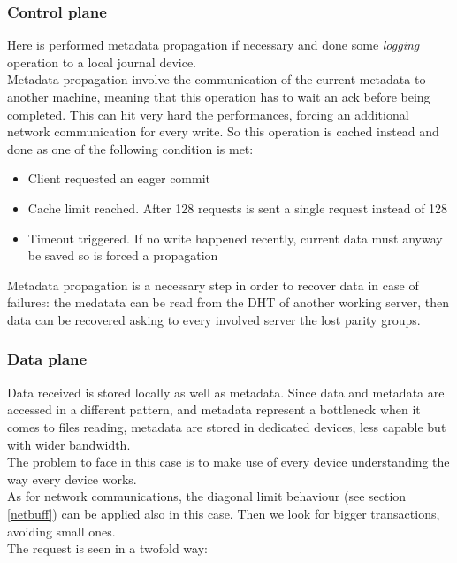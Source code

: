 \subsubsection*{Control plane}
Here is performed metadata propagation if necessary and done some
\textit{logging} operation to a local journal device. \\ Metadata propagation
involve the communication of the current metadata to another machine, meaning
that this operation has to wait an ack before being completed.  This can hit
very hard the performances, forcing an additional network communication for
every write. So this operation is cached instead and done as one of the
following condition is met:
\begin{itemize}
    \item Client requested an eager commit
    \item Cache limit reached. After 128 requests is sent a single request
        instead of 128
    \item Timeout triggered. If no write happened recently, current
        data must anyway be saved so is forced a propagation
\end{itemize}
Metadata propagation is a necessary step in order to recover data in case of
failures: the medatata can be read from the DHT of another working server, then
data can be recovered asking to every involved server the lost parity groups.

\subsubsection*{Data plane}
Data received is stored locally as well as metadata. Since data and metadata
are accessed in a different pattern, and metadata represent a bottleneck when
it comes to files reading, metadata are stored in dedicated devices, less
capable but with wider bandwidth. \\
The problem to face in this case is to make use of every device understanding
the way every device works. \\
As for network communications, the diagonal limit behaviour (see section
\ref{netbuff}) can be applied also in this case. Then we look for bigger
transactions, avoiding small ones. \\
The request is seen in a twofold way: \\

